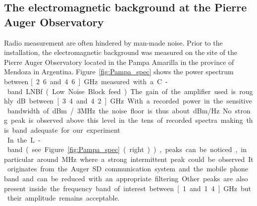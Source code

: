 \subsection{The electromagnetic background at the Pierre Auger Observatory}
Radio measurement are often hindered  by man-made noise.  Prior to the
installation, the electromagnetic background  was measured on the site
of the Pierre  Auger Observatory located in the  Pampa Amarilla in the
province of  Mendoza in Argentina.   Figure~\ref{fig:Pampa_spec} shows
the  power spectrum between  \unit[2.6 and  4.6]{GHz} measured  with a
C-band LNBf (Low Noise Block feed).  The gain of the amplifier used is
roughly \unit[60]{dB} between \unit[3.4 and 4.2]{GHz}. With a recorded
power in the sensitive  bandwidth of \mbox{\unit[-55]{dBm / 3MHz}} the
noise  floor is  thus about  \unit[-180]{dBm/Hz}.  No  strong  peak is
observed above this level in  the tens of recorded spectra making this
band   adequate   for   our   experiment.\\   In   the   L-band   (see
Figure~\ref{fig:Pampa_spec}  (right)),   peaks  can  be   noticed,  in
particular  around \unit[900]{MHz}  where a  strong  intermittent peak
could  be observed.   It originates  from the  Auger  SD communication
system  and  the  mobile  phone  band  and  can  be  reduced  with  an
appropriate  filtering.   Other  peaks  are also  present  inside  the
frequency  band of interest  between \unit[1  and 1.4]{GHz}  but their
amplitude remains acceptable.
\begin{figure}[!t]
\end{figure}


